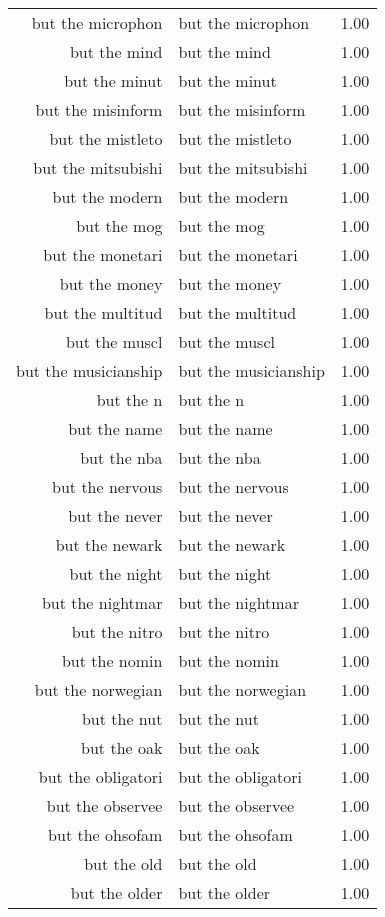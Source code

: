 \begin{table}[ht]
\begin{tabular}{rlr}
  but the microphon & but the microphon & 1.00 \\ 
  but the mind & but the mind & 1.00 \\ 
  but the minut & but the minut & 1.00 \\ 
  but the misinform & but the misinform & 1.00 \\ 
  but the mistleto & but the mistleto & 1.00 \\ 
  but the mitsubishi & but the mitsubishi & 1.00 \\ 
  but the modern & but the modern & 1.00 \\ 
  but the mog & but the mog & 1.00 \\ 
  but the monetari & but the monetari & 1.00 \\ 
  but the money & but the money & 1.00 \\ 
  but the multitud & but the multitud & 1.00 \\ 
  but the muscl & but the muscl & 1.00 \\ 
  but the musicianship & but the musicianship & 1.00 \\ 
  but the n & but the n & 1.00 \\ 
  but the name & but the name & 1.00 \\ 
  but the nba & but the nba & 1.00 \\ 
  but the nervous & but the nervous & 1.00 \\ 
  but the never & but the never & 1.00 \\ 
  but the newark & but the newark & 1.00 \\ 
  but the night & but the night & 1.00 \\ 
  but the nightmar & but the nightmar & 1.00 \\ 
  but the nitro & but the nitro & 1.00 \\ 
  but the nomin & but the nomin & 1.00 \\ 
  but the norwegian & but the norwegian & 1.00 \\ 
  but the nut & but the nut & 1.00 \\ 
  but the oak & but the oak & 1.00 \\ 
  but the obligatori & but the obligatori & 1.00 \\ 
  but the observee & but the observee & 1.00 \\ 
  but the ohsofam & but the ohsofam & 1.00 \\ 
  but the old & but the old & 1.00 \\ 
  but the older & but the older & 1.00 \\ 

\end{tabular}
\end{table}
